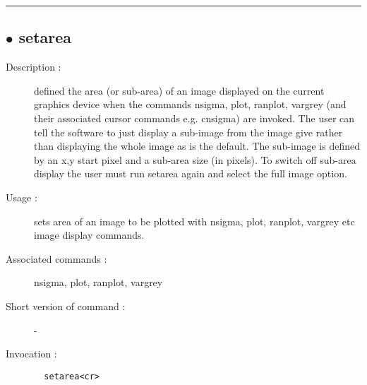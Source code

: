 \hrule \subsection*{$\bullet$ setarea}
\begin{description}
\item[Description :] defined the area (or sub-area) of an image displayed on the
current graphics device when the commands nsigma, plot, ranplot, vargrey
(and their associated cursor commands e.g. cnsigma) are invoked.  The
user can tell the software to just display a sub-image from the image
give rather than displaying the whole image as is the default.  The
sub-image is defined by an x,y start pixel and a sub-area size (in
pixels).  To switch off sub-area display the user must run setarea again
and select the full image option.
\item[Usage :] sets area of an image to be plotted with nsigma, plot, ranplot,
vargrey etc image display commands.
\item[Associated commands :] nsigma, plot, ranplot, vargrey
\item[Short version of command :] -
\item[Invocation :]

\verb+  setarea<cr> +\end{description}

